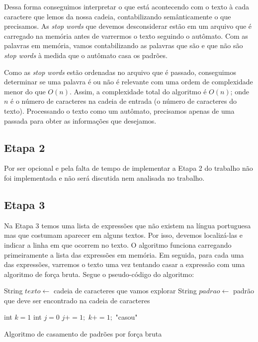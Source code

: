 \documentclass[12pt]{article}
\begin{document}
Dessa forma conseguimos interpretar o que está acontecendo com o texto à cada caractere que lemos da nossa cadeia, contabilizando semânticamente o que precisamos. As \textit{stop words} que devemos desconsiderar estão em um arquivo que é carregado na memória antes de varrermos o texto seguindo o autômato. Com as palavras em memória, vamos contabilizando as palavras que são e que não são \textit{stop words} à medida que o autômato casa os padrões. 

Como as \textit{stop words} estão ordenadas no arquivo que é passado, conseguimos determinar se uma palavra é ou não é relevante com uma ordem de complexidade menor do que $O(n)$. Assim, a complexidade total do algoritmo é $O(n)$; onde $n$ é o número de caracteres na cadeia de entrada (o número de caracteres do texto). Processando o texto como um autômato, precisamos apenas de uma passada para obter as informações que desejamos.

\subsection{Etapa 2}
Por ser opcional e pela falta de tempo de implementar a Etapa 2 do trabalho não foi implementada e não será discutida nem analisada no trabalho.

\subsection{Etapa 3}
\label{etpt}
Na Etapa 3 temos uma lista de expressões que não existem na língua portuguesa mas que costumam aparecer em alguns textos. Por isso, devemos localizá-las e indicar a linha em que ocorrem no texto. O algoritmo funciona carregando primeiramente a lista das expressões em memória. Em seguida, para cada uma das expressões, varremos o texto uma vez tentando casar a expressão com uma algoritmo de força bruta. Segue o pseudo-código do algoritmo:

\begin{algorithm}[h!]
\begin{footnotesize}
String $texto \longleftarrow$ cadeia de caracteres que vamos explorar\;
String $padrao\longleftarrow$ padrão que deve ser encontrado na cadeia de caracteres\;

{
  int $k = 1$\;
  int $j = 0$\;
  {
  	$j += 1;$
  	$k += 1;$
  	{
  		\Return "casou"\;
  	}
  }
}

\caption{Algoritmo de casamento de padrões por força bruta}
\end{footnotesize}
\end{algorithm}
\end{document}
